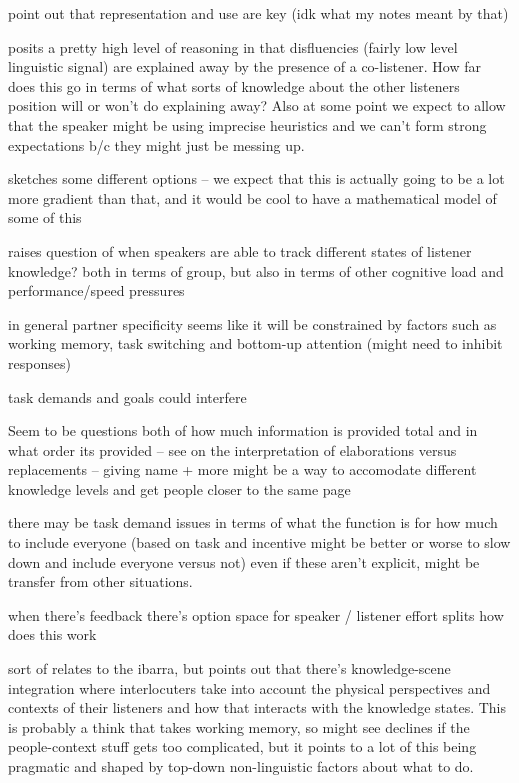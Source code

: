 \documentclass[]{article}
\begin{document}
\cite{yoon2014} point out that representation and use are key (idk what my notes meant by that) 

\cite{yoon2014} posits a pretty high level of reasoning in that disfluencies (fairly low level linguistic signal) are explained away by the presence of a co-listener. How far does this go in terms of what sorts of knowledge about the other listeners position will or won't do explaining away? Also at some point we expect to allow that the speaker might be using imprecise heuristics and we can't form strong expectations b/c they might just be messing up. 

\cite{yoon2018} sketches some different options -- we expect that this is actually going to be a lot more gradient than that, and it would be cool to have a mathematical model of some of this

\cite{yoon2018} raises question of when speakers are able to track different states of listener knowledge? both in terms of group, but also in terms of other cognitive load and performance/speed pressures 

in general partner specificity seems like it will be constrained by factors such as working memory, task switching and bottom-up attention (might need to inhibit responses) 

task demands and goals could interfere

Seem to be questions both of how much information is provided total and in what order its provided -- see \cite{yoon2018} on the interpretation of elaborations versus replacements -- giving name + more might be a way to accomodate different knowledge levels and get people closer to the same page 

\cite{yoon2019} there may be task demand issues in terms of what the function is for how much to include everyone (based on task and incentive might be better or worse to slow down and include everyone versus not) even if these aren't explicit, might be transfer from other situations. 

\cite{yoon2019} when there's feedback there's option space for speaker / listener effort splits how does this work 

sort of relates to the ibarra, but \cite{yoon2019a} points out that there's knowledge-scene integration where interlocuters take into account the physical perspectives and contexts of their listeners and how that interacts with the knowledge states. This is probably a think that takes working memory, so might see declines if the people-context stuff gets too complicated, but it points to a lot of this being pragmatic and shaped by top-down non-linguistic factors about what to do. 
\end{document}
